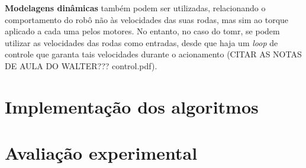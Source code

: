 \textbf{Modelagens dinâmicas} também podem ser utilizadas, relacionando o comportamento do robô não às velocidades das suas rodas, mas sim ao torque aplicado a cada uma pelos motores. No entanto, no caso do \acrshort{tomr}, se podem utilizar as velocidades das rodas como entradas, desde que haja um \emph{loop} de controle que garanta tais velocidades durante o acionamento (CITAR AS NOTAS DE AULA DO WALTER??? control.pdf).

\section{Implementação dos algoritmos}
\label{sec:software}

\section{Avaliação experimental}
\label{sec:experimental}
